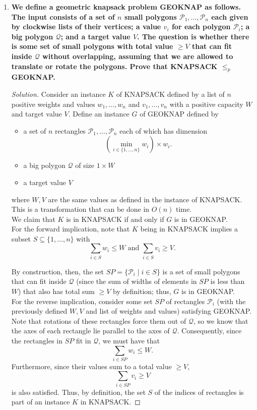 \documentclass[11pt]{article}
\newenvironment{solution}
  {\renewcommand\qedsymbol{$\blacksquare$}\begin{proof}[Solution]}
  {\end{proof}}
\begin{document}
\begin{enumerate}
\item \textbf{We define a geometric knapsack problem GEOKNAP as follows. The input consists of a set
of $n$ small polygons $\mathcal{P}_1, \dots, \mathcal{P}_n$ each given by clockwise lists of their vertices; a value $v_i$ for each polygon $\mathcal{P}_i$; a big polygon $\mathcal{Q}$; and a target value $V$. The question is whether there is some set of small polygons with total value $\geq V$ that can fit inside $\mathcal{Q}$ without overlapping, assuming that we are allowed to translate or rotate the polygons. Prove that KNAPSACK $\leq_p$ GEOKNAP.}

\begin{solution}
Consider an instance $K$ of KNAPSACK defined by a list of $n$ positive weights and values $w_1, \dots, w_n$ and $v_1, \dots, v_n$ with a positive capacity $W$ and target value $V$. Define an instance $G$ of GEOKNAP defined by 
\begin{itemize}
\item a set of $n$ rectangles $\mathcal{P}_1, \dots, \mathcal{P}_n$ each of which has dimension \[\left(\min\limits_{i \in \{1, \dots, n\}} w_i\right) \times w_i.\]
\item a big polygon $\mathcal{Q}$ of size $1 \times W$
\item a target value $V$
\end{itemize}

where $W, V$ are the same values as defined in the instance of KNAPSACK. This is a transformation that can be done in $O(n)$ time. \\

We claim that $K$ is in KNAPSACK if and only if $G$ is in GEOKNAP. \\

For the forward implication, note that $K$ being in KNAPSACK implies a subset $S \subseteq \{1, \dots, n\}$ with \[ \sum\limits_{i \in S} w_i \leq W \text{ and } \sum\limits_{i \in S} v_i \geq V.\]

By construction, then, the set $SP = \{\mathcal{P}_i \mid i \in S\}$ is a set of small polygons that can fit inside $\mathcal{Q}$ (since the sum of widths of elements in $SP$ is less than $W$) that also has total sum $\geq V$ by definition; thus, $G$ is in GEOKNAP. \\

For the reverse implication, consider some set $SP$ of rectangles $\mathcal{P}_i$ (with the previously defined $W, V$ and list of weights and values) satisfying GEOKNAP. Note that rotations of these rectangles force them out of $\mathcal{Q}$, so we know that the axes of each rectangle lie parallel to the axes of $\mathcal{Q}.$ Consequently, since the rectangles in $SP$ fit in $\mathcal{Q}$, we must have that \[ \sum\limits_{i \in SP} w_i \leq W.\] Furthermore, since their values sum to a total value $\geq V$, \[\sum\limits_{i \in SP} v_i \geq V\] is also satisfied. Thus, by definition, the set $S$ of the indices of rectangles is part of an instance $K$ in KNAPSACK. \end{solution}


\end{enumerate}
\end{document}

